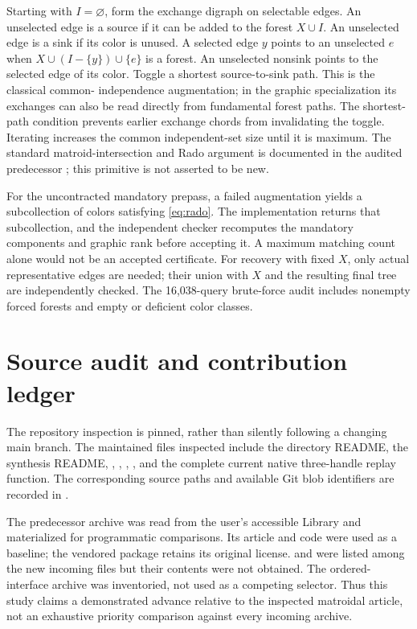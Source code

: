 \documentclass[11pt,letterpaper]{article}
\theoremstyle{definition}
\begin{document}
Starting with $I=\varnothing$, form the exchange digraph on selectable
edges. An unselected edge is a source if it can be added to the forest
$X\cup I$. An unselected edge is a sink if its color is unused. A selected
edge $y$ points to an unselected $e$ when $X\cup(I-\{y\})\cup\{e\}$
is a forest. An unselected nonsink points to the selected edge of its color.
Toggle a shortest source-to-sink path. This is the classical common-
independence augmentation; in the graphic specialization its exchanges can
also be read directly from fundamental forest paths. The shortest-path
condition prevents earlier exchange chords from invalidating the toggle.
Iterating increases the common independent-set size until it is maximum.
The standard matroid-intersection and Rado argument is documented in the
audited predecessor \cite{prior}; this primitive is not asserted to be new.

For the uncontracted mandatory prepass, a failed augmentation yields a
subcollection of colors satisfying \eqref{eq:rado}. The implementation
returns that subcollection, and the independent checker recomputes the
mandatory components and graphic rank before accepting it. A maximum
matching count alone would not be an accepted certificate. For recovery
with fixed $X$, only actual representative edges are needed; their union
with $X$ and the resulting final tree are independently checked. The
16,038-query brute-force audit includes nonempty forced forests and empty
or deficient color classes.

\section{Source audit and contribution ledger}\label{app:audit}
The repository inspection is pinned, rather than silently following a
changing main branch. The maintained files inspected include the directory
README, the synthesis README, ,
,
,
, and the complete current native
three-handle replay function. The corresponding source paths and available
Git blob identifiers are recorded in .

The predecessor archive was read from the user's accessible Library and
materialized for programmatic comparisons. Its article and code were used
as a baseline; the vendored package retains its original license.
 and
 were listed among the new
incoming files but their contents were not obtained. The ordered-interface
archive was inventoried, not used as a competing selector. Thus this study
claims a demonstrated advance relative to the inspected matroidal article,
not an exhaustive priority comparison against every incoming archive.
\end{document}
